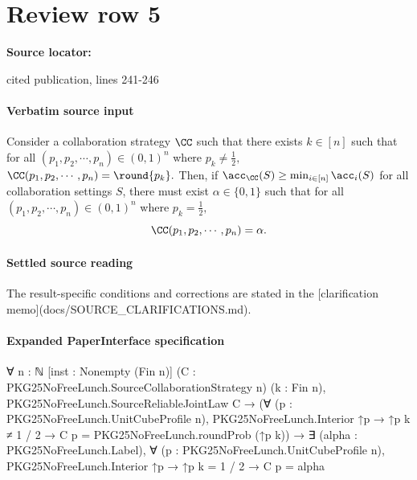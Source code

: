 \documentclass[10pt]{article}
\begin{document}
\section*{Review row 5}
\textbf{Source locator:} {\footnotesize\raggedright cited publication, lines 241-\allowbreak{}246\par}
\paragraph{Verbatim source input}
\begin{ReviewVerbatim}
\begin{proposition}\label{prop:part2}
    Consider a collaboration strategy $\CC$ such that there exists $k\in [n]$ such that for all $(p_1,p_2,\cdots,p_n)\in (0,1)^n$ where $p_k\neq \frac{1}{2},$ $\CC(p_1,p_2,\cdots,p_n)=\round{p_k}.$ Then, if $\acc_\CC(S)\ge \min_{i\in [n]}\acc_i(S)$ for all collaboration settings $S$, there must exist $\alpha\in \{0,1\}$ such that for all $(p_1,p_2,\cdots,p_n)\in (0,1)^n$ where $p_k=\frac{1}{2},$
    \begin{equation}\label{eq:horse}
        \CC(p_1,p_2,\cdots,p_n)=\alpha.
    \end{equation}
\end{proposition}
\end{ReviewVerbatim}

\paragraph{Settled source reading}
The result-\allowbreak{}specific conditions and corrections are stated in the [clarification memo](docs/\allowbreak{}SOURCE\_\allowbreak{}CLARIFICATIONS.\allowbreak{}md).\allowbreak{}

\paragraph{Expanded PaperInterface specification}
\begin{ReviewVerbatim}
∀ {n : ℕ} [inst : Nonempty (Fin n)] (C : PKG25NoFreeLunch.SourceCollaborationStrategy n) (k : Fin n),
  PKG25NoFreeLunch.SourceReliableJointLaw C →
    (∀ (p : PKG25NoFreeLunch.UnitCubeProfile n),
        PKG25NoFreeLunch.Interior ↑p → ↑p k ≠ 1 / 2 → C p = PKG25NoFreeLunch.roundProb (↑p k)) →
      ∃ (alpha : PKG25NoFreeLunch.Label),
        ∀ (p : PKG25NoFreeLunch.UnitCubeProfile n), PKG25NoFreeLunch.Interior ↑p → ↑p k = 1 / 2 → C p = alpha
\end{ReviewVerbatim}
\end{document}
